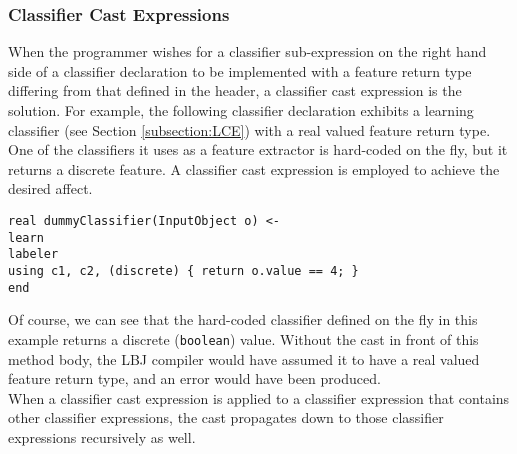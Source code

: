 \subsubsection{Classifier Cast Expressions} \label{subsection:castExpressions}
When the programmer wishes for a classifier sub-expression on the right hand
side of a classifier declaration to be implemented with a feature return type
differing from that defined in the header, a classifier cast expression is the
solution.  For example, the following classifier declaration exhibits a
learning classifier (see Section \ref{subsection:LCE}) with a real valued
feature return type.  One of the classifiers it uses as a feature extractor is
hard-coded on the fly, but it returns a discrete feature.  A classifier cast
expression is employed to achieve the desired affect.

\begin{center}
\begin{algorithm}
    {\tt real dummyClassifier(InputObject o) <-}
\\  {\tt learn} \+
\\  {\tt  labeler}
\\  {\tt  using c1, c2, (discrete) \{ return o.value == 4; \}} \-
\\  {\tt end}
\end{algorithm}
\end{center}

\noindent
Of course, we can see that the hard-coded classifier defined on the fly in
this example returns a discrete ({\tt boolean}) value.  Without the cast in
front of this method body, the LBJ compiler would have assumed it to have a
real valued feature return type, and an error would have been produced. \\

When a classifier cast expression is applied to a classifier expression that
contains other classifier expressions, the cast propagates down to those
classifier expressions recursively as well.

